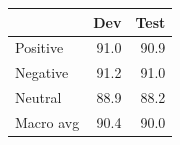 \begin{tabular}{lrr}
\toprule
{} &  Dev &  Test \\
\midrule
Positive  & 91.0 &  90.9 \\
Negative  & 91.2 &  91.0 \\
Neutral   & 88.9 &  88.2 \\
Macro avg & 90.4 &  90.0 \\
\bottomrule
\end{tabular}
